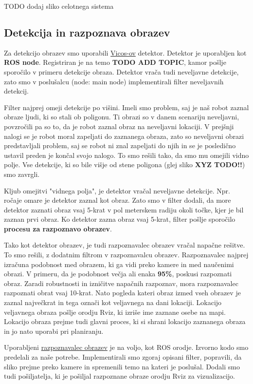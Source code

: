\documentclass[a4paper,11pt]{article}
\begin{document}
TODO dodaj sliko celotnega sistema

\subsection{Detekcija in razpoznava obrazev}

Za detekcijo obrazev smo uporabili \href{https://github.com/vicoslab/vicos_ros}{Vicos-ov} detektor. Detektor je uporabljen kot \textbf{ROS node}. Registriran je na temo \textbf{TODO ADD TOPIC}, kamor pošlje sporočilo v primeru detekcije obraza. Detektor vrača tudi neveljavne detekcije, zato smo v poslušalcu (node: main node) implementirali filter neveljavnih detekcij.

Filter najprej omeji detekcije po višini. Imeli smo problem, saj je naš robot zaznal obraze ljudi, ki so stali ob poligonu. Ti obrazi so v danem scenariju neveljavni, povzročili pa so to, da je robot zaznal obraz na neveljavni lokaciji. V prejšnji nalogi se je robot moral zapeljati do zaznanega obraza, zato so neveljavni obrazi predstavljali problem, saj se robot ni znal zapeljati do njih in se je posledično ustavil preden je končal svojo nalogo. To smo rešili tako, da smo mu omejili vidno polje. Vse detekcije, ki so bile višje od stene poligona (glej sliko \textbf{XYZ TODO!!}) smo zavrgli. 

Kljub omejitvi "vidnega polja", je detektor vračal neveljavne detekcije. Npr. ročaje omare je detektor zaznal kot obraz. Zato smo v filter dodali, da more detektor zaznati obraz vsaj 5-krat v pol meterskem radiju okoli točke, kjer je bil zaznan prvi obraz. Ko detektor zazna obraz vsaj 5-krat, filter pošlje sporočilo \textbf{procesu za razpoznavo obrazev}. 

Tako kot detektor obrazev, je tudi razpoznavalec obrazev vračal napačne rešitve. To smo rešili, z dodatnim filtrom v razpoznavalcu obrazev. Razpoznavalec najprej izračuna podobnost med obrazem, ki ga vidi preko kamere in med naučenimi obrazi. V primeru, da je podobnost večja ali enaka \textbf{95\%}, poskusi razpoznati obraz. Zaradi robustnosti in izničitve napačnih razpoznav, mora razpoznavalec razpoznati obrat vsaj 10-krat. Nato pogleda kateri obraz izmed vseh obrazev je zaznal največkrat in tega označi kot veljavnega na dani lokaciji. Lokacijo veljavnega obraza pošlje orodju Rviz, ki izriše ime zaznane osebe na mapi. Lokacijo obraza prejme tudi glavni proces, ki si shrani lokacijo zaznanega obraza in jo nato uporabi pri planiranju.
 
Uporabljeni \href{http://wiki.ros.org/face_recognition}{razpoznavalec obrazev} je na voljo, kot ROS orodje. Izvorno kodo smo predelali za naše potrebe. Implementirali smo zgoraj opisani filter, popravili, da sliko prejme preko kamere in spremenili temo na kateri je poslušal. Dodali smo tudi pošiljatelja, ki je pošiljal razpoznane obraze orodju Rviz za vizualizacijo.
\end{document}
